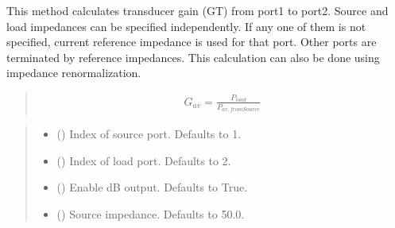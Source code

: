 \documentclass[letterpaper,10pt,english]{sphinxmanual}
\begin{document}
\begin{fulllineitems}
\begin{fulllineitems}
\label{\detokenize{touchstone:touchstone.spfile.gt}}
\pysigstartsignatures
{}
\pysigstopsignatures
\sphinxAtStartPar
This method calculates transducer gain (GT) from port1 to port2. Source and load impedances can be specified independently. If any one of them is not specified, current reference impedance is used for that port. Other ports are terminated by reference impedances. This calculation can also be done using impedance renormalization.
\begin{quote}
\begin{equation*}
\begin{split}G_{av}=\frac{P_{load}}{P_{av,fromSource}}\end{split}
\end{equation*}\end{quote}
\begin{quote}\begin{description}
\begin{itemize}
\item {}
\sphinxAtStartPar
{} (\sphinxstyleliteralemphasis{\sphinxupquote{, }}) \textendash{} Index of source port. Defaults to 1.

\item {}
\sphinxAtStartPar
{} (\sphinxstyleliteralemphasis{\sphinxupquote{, }}) \textendash{} Index of load port. Defaults to 2.

\item {}
\sphinxAtStartPar
{} (\sphinxstyleliteralemphasis{\sphinxupquote{, }}) \textendash{} Enable dB output. Defaults to True.

\item {}
\sphinxAtStartPar
{} (\sphinxstyleliteralemphasis{\sphinxupquote{, }}) \textendash{} Source impedance. Defaults to 50.0.


\end{itemize}
\end{description}
\end{quote}
\end{fulllineitems}
\end{fulllineitems}
\end{document}
